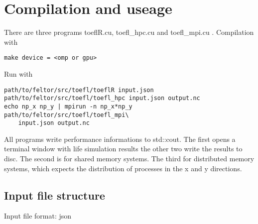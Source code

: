 \section{Compilation and useage}
There are three programs toeflR.cu, toefl\_hpc.cu and toefl\_mpi.cu . Compilation with 
\begin{verbatim}
make device = <omp or gpu>
\end{verbatim}
Run with
\begin{verbatim}
path/to/feltor/src/toefl/toeflR input.json
path/to/feltor/src/toefl/toefl_hpc input.json output.nc
echo np_x np_y | mpirun -n np_x*np_y path/to/feltor/src/toefl/toefl_mpi\
    input.json output.nc
\end{verbatim}
All programs write performance informations to std::cout.
The first opens a terminal window with life simulation results the
other two write the results to disc. The
second is for shared memory systems. The third for distributed
memory systems, which expects the distribution of processes in the
x and y directions.

\subsection{Input file structure}
Input file format: json

